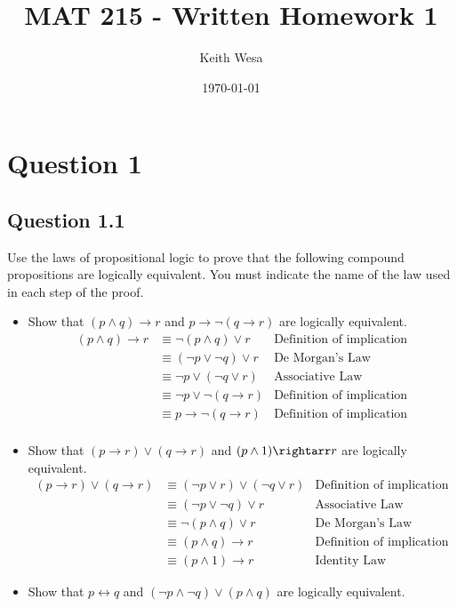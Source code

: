 \documentclass{article}
\author{Keith Wesa}
\title{MAT 215 - Written Homework 1}
\date{\today}
\begin{document}
\section*{Question 1}

\subsection*{\textbf{Question 1.1}}
Use the laws of propositional logic to prove that the following compound propositions are logically equivalent. You must indicate the name of the law used in each step of the proof.

\begin{itemize}
    \item[] Show that $(p \land q) \rightarrow r$ and $p \rightarrow \lnot (q \rightarrow r)$ are logically equivalent.
    \begin{align*}
        (p \land q) \rightarrow r &\equiv \neg(p \land q) \lor r & \text{Definition of implication}\\
        &\equiv (\neg p \lor \neg q) \lor r & \text{De Morgan's Law}\\
        &\equiv \neg p \lor (\neg q \lor r) & \text{Associative Law}\\
        &\equiv \neg p \lor \neg(q \rightarrow r) & \text{Definition of implication}\\
        &\equiv p \rightarrow \neg (q \rightarrow r) & \text{Definition of implication} \\
    \end{align*}
    \item[] Show that $(p \rightarrow r) \lor (q \rightarrow r)$ and $(p \land 1) \rightarr r$ are logically equivalent.
    \begin{align*}
        (p \rightarrow r) \lor (q \rightarrow r) &\equiv (\neg p \lor r) \lor (\neg q \lor r) & \text{Definition of implication}\\
        &\equiv (\neg p \lor \neg q) \lor r & \text{Associative Law}\\
        &\equiv \neg(p \land q) \lor r & \text{De Morgan's Law}\\
        &\equiv (p \land q) \rightarrow r & \text{Definition of implication}\\
        &\equiv (p \land 1) \rightarrow r & \text{Identity Law}
    \end{align*}
    \item[] Show that $p \leftrightarrow q$ and $(\lnot p \land \lnot q) \lor (p \land q)$ are logically equivalent.

\end{itemize}
\end{document}
